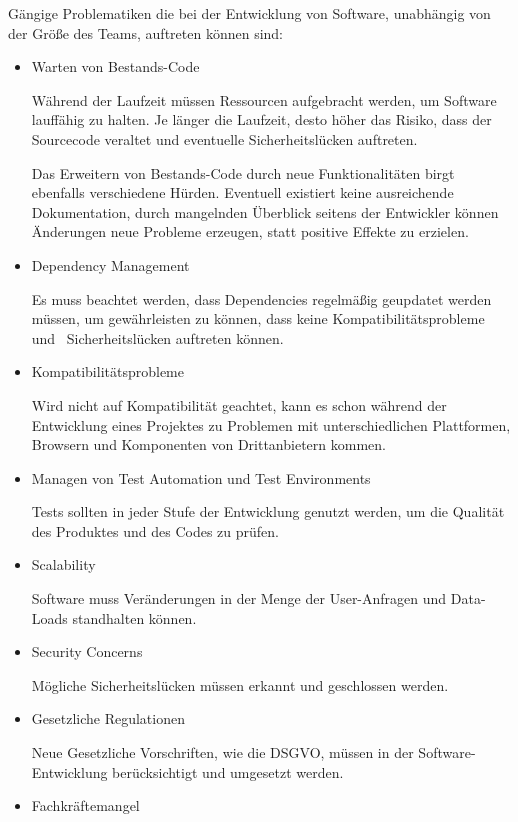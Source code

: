 \documentclass[acmtog, language=ngerman]{acmart}
\begin{document}
Gängige Problematiken die bei der Entwicklung von Software, unabhängig von der Größe des Teams, auftreten können sind: 
\begin{itemize}
\item Warten von Bestands-Code

Während der Laufzeit müssen Ressourcen aufgebracht werden, um Software lauffähig zu halten. Je länger die Laufzeit, desto höher das Risiko, dass der Sourcecode veraltet und eventuelle Sicherheitslücken auftreten. 

Das Erweitern von Bestands-Code durch neue Funktionalitäten birgt ebenfalls verschiedene Hürden. Eventuell existiert keine ausreichende Dokumentation, durch mangelnden Überblick seitens der Entwickler können Änderungen neue Probleme erzeugen, statt positive Effekte zu erzielen.

\item Dependency Management

Es muss beachtet werden, dass Dependencies regelmäßig geupdatet werden müssen, um gewährleisten zu können, dass keine Kompatibilitätsprobleme und  Sicherheitslücken auftreten können.

\item Kompatibilitätsprobleme

Wird nicht auf Kompatibilität geachtet, kann es schon während der Entwicklung eines Projektes zu Problemen mit unterschiedlichen Plattformen, Browsern und Komponenten von Drittanbietern kommen. 

\item Managen von Test Automation und Test Environments

Tests sollten in jeder Stufe der Entwicklung genutzt werden, um die Qualität des Produktes und des Codes zu prüfen.

\item Scalability

Software muss Veränderungen in der Menge der User-Anfragen und Data-Loads standhalten können.

\item Security Concerns

Mögliche Sicherheitslücken müssen erkannt und geschlossen werden. 

\item Gesetzliche Regulationen

Neue Gesetzliche Vorschriften, wie die DSGVO, müssen in der Software-Entwicklung berücksichtigt und umgesetzt werden.

\item Fachkräftemangel


\end{itemize}
\end{document}

